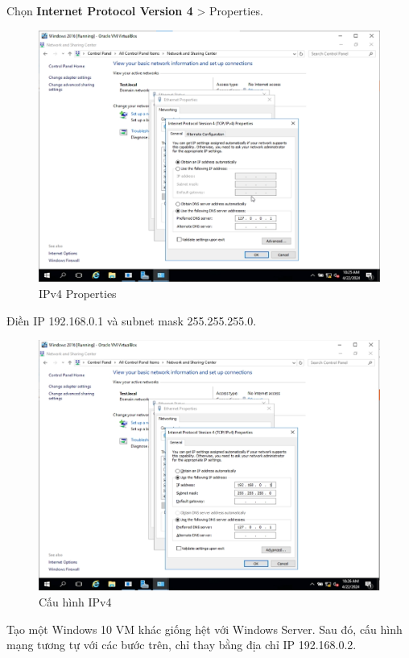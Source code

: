 \newpage

 Chọn \textbf{Internet Protocol Version 4} > Properties. 

\begin{figure}[!htb]
    \centering
    \includegraphics[width=0.85\linewidth]{figure//chapter5//lab5_2/ipv4_properties.png}
    \caption{IPv4 Properties}
    \label{fig:enter-label}
\end{figure}

 Điền IP 192.168.0.1 và subnet mask 255.255.255.0.

\begin{figure}[!htb]
    \centering
    \includegraphics[width=0.85\linewidth]{figure//chapter5//lab5_2/configure_ip.png}
    \caption{Cấu hình IPv4}
    \label{fig:enter-label}
\end{figure}

\newpage

 Tạo một Windows 10 VM khác giống hệt với Windows Server. Sau đó, cấu hình mạng tương tự với các bước trên, chỉ thay bằng địa chỉ IP 192.168.0.2.

